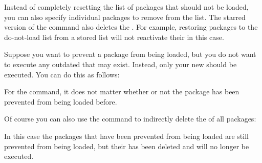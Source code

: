 \begin{Declaration}
\end{Declaration}
Instead of completely resetting the list
of packages that should not be loaded, you can also specify individual
packages to remove from the list. The starred version of the command also
deletes the . For example, restoring packages to the
do-not-load list from a stored list will not reactivate their  in this case.%
%
\begin{Example}
  Suppose you want to prevent a  package from being loaded, but
  you do not want to execute any outdated  that may
  exist. Instead, only your new  should be executed. You
  can do this as follows:
\begin{lstcode}
\end{lstcode}
  For the  command, it does not matter
  whether or not the package has been prevented from being loaded before.

  Of course you can also use the command to indirectly delete the
   of all packages:
\begin{lstcode}
  \StorePreventPackageFromLoading\TheWholePreventList
  \UnPreventPackageFromLoading*{\TheWholePreventList}
  \PreventPackageFromLoading{\TheWholePreventList}
\end{lstcode}
  In this case the packages that have been prevented from being loaded are
  still prevented from being loaded, but their  has been
  deleted and will no longer be executed.%
\end{Example}%
\EndIndexGroup
%
\EndIndexGroup

\endinput

